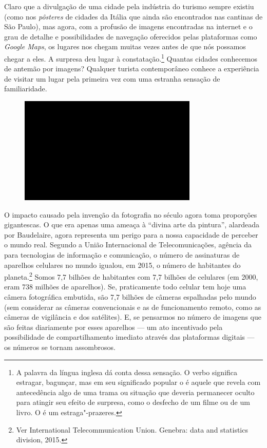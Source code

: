 Claro que a divulgação de uma cidade pela indústria do turismo sempre
existiu (como nos \emph{pôsteres} de cidades da Itália que ainda são
encontrados nas cantinas de São Paulo), mas agora, com a profusão de
imagens encontradas na internet e o grau de detalhe e possibilidades de
navegação oferecidos pelas plataformas como \emph{Google Maps}, os
lugares nos chegam muitas vezes antes de que nós possamos chegar a eles.
A surpresa deu lugar à constatação.\footnote{A palavra da língua inglesa
  {} dá conta dessa sensação. O verbo {}
  significa estragar, bagunçar, mas em seu significado popular o
  {} é aquele que revela com antecedência algo de uma trama
  ou situação que deveria permanecer oculto para atingir seu efeito de
  surpresa, como o desfecho de um filme ou de um livro. O {}
  é um estraga"-prazeres.} Quantas cidades conhecemos de antemão por
imagens? Qualquer turista contemporâneo conhece a experiência de visitar
um lugar pela primeira vez com uma estranha sensação de familiaridade.

\begin{figure}[!ht]

\centering
 \includegraphics[width=85mm]{./imgs/im1.jpg}
\caption{\tiny{}}

\end{figure}

O impacto causado pela invenção da fotografia no século  agora toma
proporções gigantescas. O que era apenas uma ameaça à ``divina arte da
pintura'', alardeada por Baudelaire, agora representa um perigo para a
nossa capacidade de perceber o mundo real. Segundo a União Internacional
de Telecomunicações, agência da  para tecnologias de informação e
comunicação, o número de assinaturas de aparelhos celulares no mundo
igualou, em 2015, o número de habitantes do planeta.\footnote{Ver
  International Telecommunication Union. {} Genebra:  data and statistics division, 2015.}
Somos 7,7 bilhões de habitantes com 7,7 bilhões de celulares (em 2000, eram 738 milhões de aparelhos). Se, praticamente todo celular tem hoje uma câmera fotográfica embutida, são 7,7 bilhões de câmeras espalhadas pelo mundo (sem considerar as
câmeras convencionais e as de funcionamento remoto, como as câmeras de
vigilância e dos satélites). E, se pensarmos no número de imagens que
são feitas diariamente por esses aparelhos --- um ato incentivado pela
possibilidade de compartilhamento imediato através das plataformas
digitais --- os números se tornam assombrosos.

